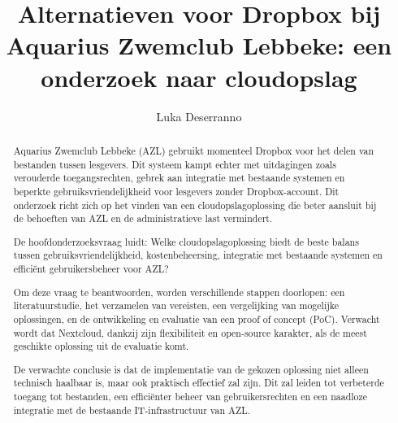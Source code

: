 \documentclass{hogent-article}
\title{Alternatieven voor Dropbox bij Aquarius Zwemclub Lebbeke: een onderzoek naar cloudopslag}
\author{Luka Deserranno}
\begin{document}
\begin{abstract}
  Aquarius Zwemclub Lebbeke (AZL) gebruikt momenteel Dropbox voor het delen van bestanden tussen lesgevers. Dit systeem kampt echter met uitdagingen zoals verouderde toegangsrechten, gebrek aan integratie met bestaande systemen en beperkte gebruiksvriendelijkheid voor lesgevers zonder Dropbox-account. Dit onderzoek richt zich op het vinden van een cloudopslagoplossing die beter aansluit bij de behoeften van AZL en de administratieve last vermindert.
  
  De hoofdonderzoeksvraag luidt: Welke cloudopslagoplossing biedt de beste balans tussen gebruiksvriendelijkheid, kostenbeheersing, integratie met bestaande systemen en efficiënt gebruikersbeheer voor AZL?
  
  Om deze vraag te beantwoorden, worden verschillende stappen doorlopen: een literatuurstudie, het verzamelen van vereisten, een vergelijking van mogelijke oplossingen, en de ontwikkeling en evaluatie van een proof of concept (PoC). Verwacht wordt dat Nextcloud, dankzij zijn flexibiliteit en open-source karakter, als de meest geschikte oplossing uit de evaluatie komt.
  
  De verwachte conclusie is dat de implementatie van de gekozen oplossing niet alleen technisch haalbaar is, maar ook praktisch effectief zal zijn. Dit zal leiden tot verbeterde toegang tot bestanden, een efficiënter beheer van gebruikersrechten en een naadloze integratie met de bestaande IT-infrastructuur van AZL.
\end{abstract}

\tableofcontents



\printbibliography[heading=bibintoc]
\end{document}
